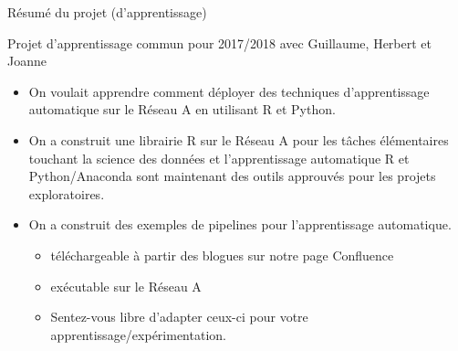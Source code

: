 


\begin{frame}{\vskip -0.15cm \LARGE R\'{e}sum\'{e} du projet (d'apprentissage)}

\small

\begin{center}
{\normalsize Projet d'apprentissage commun pour 2017/2018 avec\vskip 0.15cm \Large Guillaume, Herbert et Joanne}
\end{center}

\begin{itemize}
\item
	On voulait apprendre comment d\'{e}ployer des techniques d'apprentissage automatique
	sur le R\'{e}seau A en utilisant R et Python.
\item
	On a construit une librairie R sur le R\'{e}seau A pour
	les t\^aches \'el\'ementaires touchant la science des donn\'ees et l'apprentissage automatique
	\vskip -0.1cm
	{\scriptsize R et Python/Anaconda sont maintenant des outils approuv\'es pour les projets exploratoires.}
\item
	On a construit des exemples de pipelines pour l'apprentissage automatique.
	{\scriptsize
	\begin{itemize}
	\item
		{\footnotesize t\'{e}l\'{e}chargeable \`a partir des blogues sur notre page Confluence}
	\item
		{\footnotesize ex\'{e}cutable sur le R\'{e}seau A}
	\item
		{\scriptsize\color{red}Sentez-vous libre d'adapter ceux-ci pour votre apprentissage/exp\'{e}rimentation.}
	\end{itemize}}
\end{itemize}

\end{frame}
\normalsize

